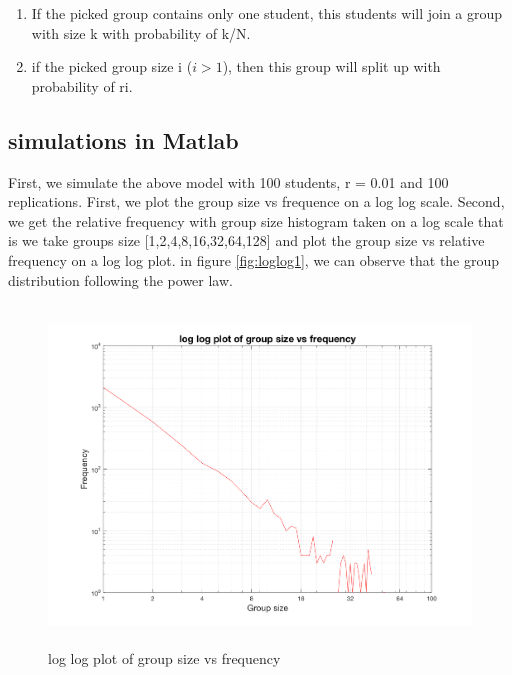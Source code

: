 \documentclass[12pt]{article}
\begin{document}
\begin{enumerate}
\item If the picked group contains only one student, this students will join a group with size k with probability of k/N.  
\item if the picked group size i ($i > 1$), then this group will split up with probability of ri. 
\end{enumerate}


\subsection{simulations in Matlab}
First, we simulate the above model with 100 students, r = 0.01 and 100 replications. First, we plot the group size vs frequence on a log log scale. Second, we get the relative frequency with group size histogram taken on a log scale that is we take groups size [1,2,4,8,16,32,64,128] and plot the group size vs relative frequency on a log log plot. in figure \ref{fig:loglog1}, we can observe that the group distribution following the power law. 


\begin{figure}[H] %
\centering
\includegraphics[width = 12 cm, height = 9cm]{loglog2.png}
\caption{log log plot of group size vs frequency}
\label{fig:loglog2}
\end{figure}
\end{document}
